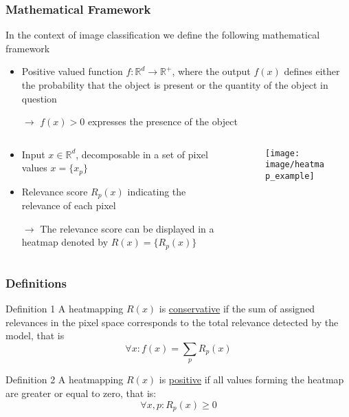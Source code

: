 \documentclass{beamer}
\begin{document}
\begin{frame}
\frametitle{Mathematical Framework}

In the context of image classification we define the following mathematical framework
\begin{itemize}
\item Positive valued function $f:\mathbb{R}^d\to \mathbb{R}^+$, where the output $f(x)$ defines either the probability that the object is present or the quantity of the object in question
\item[$\rightarrow$] $f(x)>0$ expresses the presence of the object  


\end{itemize}

 \begin{columns}
          \begin{column}[T]{8cm}
          		\begin{itemize}
          		\item Input $x \in \mathbb{R}^d$, decomposable in a set of pixel values $x=\{x_p\}$
			\item Relevance score $R_p(x)$ indicating the relevance of each pixel
			\item[$\rightarrow$] The relevance score can be displayed in a heatmap denoted by $R(x) = \{R_p(x)\}$
			\end{itemize}

            \end{column} 
            \begin{column}[T]{3.5cm}
			\begin{figure}
			\texttt{[image: image/heatmap\_example]}
			\end{figure}
	\end{column}
\end{columns} 

\end{frame}



\begin{frame}
\frametitle{Definitions}
\begin{block}{Definition 1}
A heatmapping $R(x)$ is \underline{conservative} if the sum of assigned relevances in the pixel space corresponds to the total relevance detected by the model, that is
\begin{equation}
\forall x: f(x)=\sum_p R_p(x)
\end{equation}
\end{block}

\vspace{0.5cm}
\pause
\begin{block}{Definition 2}
A heatmapping $R(x)$ is  \underline{positive} if all values forming the heatmap are greater or equal to zero, that is:
\begin{equation}
\forall x,p: R_p(x) \geq 0
\end{equation}
\end{block}

\end{frame}
\end{document}
